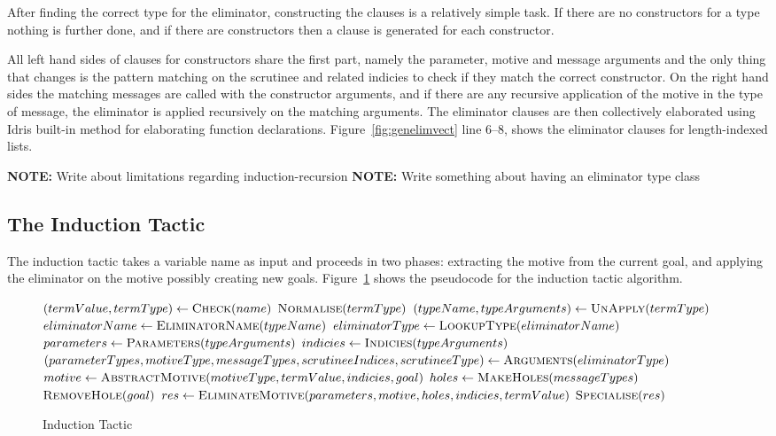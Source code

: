 \documentclass[a4paper]{article}%
\begin{document}
After finding the correct type for the eliminator, constructing the clauses is a relatively simple task. If there are no constructors for a type nothing is further done, and if there are constructors then a clause
is generated for each constructor.

All left hand sides of clauses for constructors share the first part, namely the parameter, motive and message arguments and the only thing that changes is the pattern matching
on the scrutinee and related indicies to check if they match the correct constructor. On the right hand sides the matching messages are called with the constructor arguments, and if there are any recursive application of the motive
in the type of message, the eliminator is applied recursively on the matching arguments. The eliminator clauses are then collectively elaborated using Idris built-in method for elaborating function declarations.
Figure~\ref{fig:genelimvect} line 6--8, shows the eliminator clauses for length-indexed lists.

\textbf{NOTE:} Write about limitations regarding induction-recursion
\textbf{NOTE:} Write something about having an eliminator type class

\subsection{The Induction Tactic}
\label{sub:TheInductionTactic}
The induction tactic takes a variable name as input and proceeds in two phases: extracting the motive from the current goal, and applying the eliminator on the motive possibly creating new goals. Figure~\ref{fig:indtac} shows
the pseudocode for the induction tactic algorithm.

\begin{figure}[H]
  \begin{center}
    \begin{algorithmic}[1]
    \State $\left(termValue, termType\right) \gets \Call{Check}{name}$
    \State $\Call{Normalise}{termType}$
    \State $\left(typeName, typeArguments\right) \gets \Call{UnApply}{termType}$
    \State $eliminatorName \gets \Call{EliminatorName}{typeName}$
    \State $eliminatorType \gets \Call{LookupType}{eliminatorName}$
    \State $parameters \gets \Call{Parameters}{typeArguments}$
    \State $indicies \gets \Call{Indicies}{typeArguments}$
    \State $\left(parameterTypes, motiveType, messageTypes, scrutineeIndices, scrutineeType\right) \gets \Call{Arguments}{eliminatorType}$
    \State $motive \gets \Call{AbstractMotive}{motiveType, termValue, indicies, goal}$
    \State $holes \gets \Call{MakeHoles}{messageTypes}$
    \State $\Call{RemoveHole}{goal}$
    \State $res \gets \Call{EliminateMotive}{parameters, motive, holes, indicies, termValue}$
    \State \Return $\Call{Specialise}{res}$
    \EndProcedure
  \end{algorithmic}
  \end{center}
\caption{Induction Tactic}
\label{fig:indtac}
\end{figure}
\end{document}
